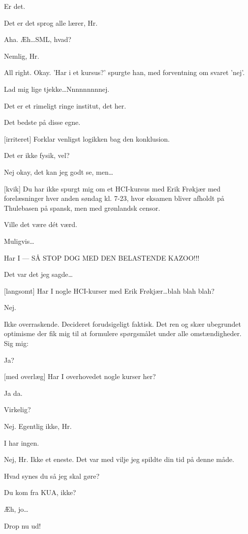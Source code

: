 \documentclass[a4paper,11pt]{article}
\begin{document}
\begin{sketch}
   Er det.

   Det er det sprog alle lærer, Hr.

   Aha. Æh\ldots SML, hvad?

   Nemlig, Hr.

   All right. Okay. 'Har i et kursus?' spurgte han, med forventning om
  svaret 'nej'.

   Lad mig lige tjekke\ldots Nnnnnnnnnej.

   Det er et rimeligt ringe institut, det her.

   Det bedste på disse egne.

  [irriteret] Forklar venligst logikken bag den konklusion.

   Det er ikke fysik, vel?

   Nej okay, det kan jeg godt se, men\ldots

  [kvik] Du har ikke spurgt mig om et HCI-kursus med Erik Frøkjær med
  forelæsninger hver anden søndag kl. 7-23, hvor eksamen bliver afholdt på
  Thulebasen på spansk, men med grønlandsk censor.

   Ville det være dét værd.

   Muligvis\ldots

   Har I --- SÅ STOP DOG MED DEN BELASTENDE KAZOO!!!

   Det var det jeg sagde\ldots


  [langsomt] Har I nogle HCI-kurser med Erik Frøkjær\ldots blah blah
  blah?

   Nej.

   Ikke overraskende. Decideret forudsigeligt faktisk. Det ren og skær
  ubegrundet optimisme der fik mig til at formulere spørgsmålet under alle
  omstændigheder. Sig mig:

   Ja?

  [med overlæg] Har I overhovedet nogle kurser her?

   Ja da.

   Virkelig?


   Nej. Egentlig ikke, Hr.

   I har ingen.

   Nej, Hr. Ikke et eneste. Det var med vilje jeg spildte din tid på
  denne måde.

   Hvad synes du så jeg skal gøre?

   Du kom fra KUA, ikke?

   Æh, jo\ldots

   Drop nu ud!


\end{sketch}
\end{document}
